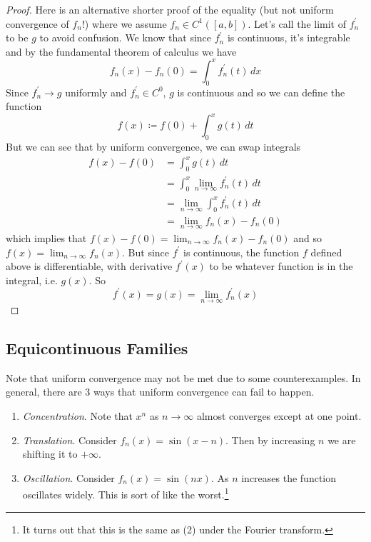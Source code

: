   \begin{proof}
    Here is an alternative shorter proof of the equality (but not uniform convergence of $f_n$!) where we assume $f_n \in C^1([a, b])$. 
    Let's call the limit of $f^\prime_n$ to be $g$ to avoid confusion. We know that since $f_n^\prime$ is continuous, it's integrable and by the fundamental theorem of calculus we have 
    \begin{equation}
      f_n (x) - f_n (0) = \int_0^x f_n^\prime (t) \,dx 
    \end{equation}
    Since $f_n^\prime \to g$ uniformly and $f_n^\prime \in C^0$, $g$ is continuous and so we can define the function
    \begin{equation}
      f(x) \coloneqq f(0) + \int_0^x g(t) \,dt
    \end{equation}
    But we can see that by uniform convergence, we can swap integrals  
    \begin{align}
      f(x) - f(0) & = \int_0^x g(t) \,dt \\ 
                  & = \int_0^x \lim_{n \to \infty} f_n^\prime (t) \,dt \\
                  & = \lim_{n \to \infty} \int_0^x f_n^\prime (t) \,dt \\ 
                  & = \lim_{n \to \infty} f_n (x) - f_n (0) 
    \end{align}
    which implies that $f(x) - f(0) = \lim_{n \to \infty} f_n (x) - f_n (0)$ and so $f(x) = \lim_{n \to \infty} f_n (x)$. But since $f^\prime$ is continuous, the function $f$ defined above is differentiable, with derivative $f^\prime (x)$ to be whatever function is in the integral, i.e. $g(x)$. So
    \begin{equation}
      f^\prime (x) = g(x) = \lim_{n \to \infty} f_n^\prime (x)
    \end{equation}
  \end{proof}

\subsection{Equicontinuous Families} 

  Note that uniform convergence may not be met due to some counterexamples. In general, there are 3 ways that uniform convergence can fail to happen. 

  \begin{enumerate}
    \item \textit{Concentration}. Note that $x^n$ as $n \to \infty$ almost converges except at one point. 
    \item \textit{Translation}. Consider $f_n (x) = \sin(x - n)$. Then by increasing $n$ we are shifting it to $+\infty$. 
    \item \textit{Oscillation}. Consider $f_n (x) = \sin(nx)$. As $n$ increases the function oscillates widely. This is sort of like the worst.\footnote{It turns out that this is the same as (2) under the Fourier transform.} 
  \end{enumerate}

